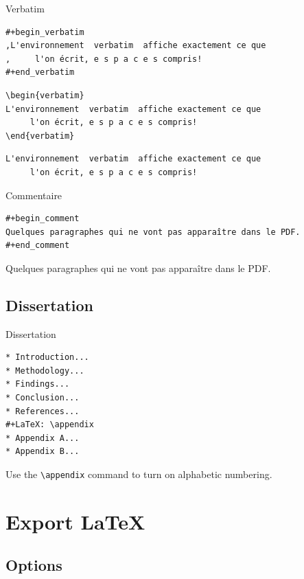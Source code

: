 \documentclass[presentation,t,hideothersubsections]{beamer}
\begin{document}
\begin{frame}[fragile,label=sec-3-8-3]{Verbatim}
 \lstset{language=org,numbers=none}
\begin{lstlisting}
#+begin_verbatim
,L'environnement  verbatim  affiche exactement ce que
,     l'on écrit, e s p a c e s compris!
#+end_verbatim
\end{lstlisting}

\lstset{language=TeX,numbers=none}
\begin{lstlisting}
\begin{verbatim}
L'environnement  verbatim  affiche exactement ce que
     l'on écrit, e s p a c e s compris!
\end{verbatim}
\end{lstlisting}

\begin{verbatim}
L'environnement  verbatim  affiche exactement ce que
     l'on écrit, e s p a c e s compris!
\end{verbatim}
\end{frame}
\begin{frame}[fragile,label=sec-3-8-4]{Commentaire}
 \lstset{language=org,numbers=none}
\begin{lstlisting}
#+begin_comment
Quelques paragraphes qui ne vont pas apparaître dans le PDF.
#+end_comment
\end{lstlisting}

Quelques paragraphes qui ne vont pas apparaître dans le PDF.
\end{frame}
\subsection{Dissertation}
\label{sec-3-9}

\begin{frame}[fragile,label=sec-3-9-1]{Dissertation}
 \lstset{language=org,numbers=none}
\begin{lstlisting}
* Introduction...
* Methodology...
* Findings...
* Conclusion...
* References...
#+LaTeX: \appendix
* Appendix A...
* Appendix B...
\end{lstlisting}

Use the \texttt{\textbackslash{}appendix} command to turn on alphabetic numbering.
\end{frame}
\section{Export \LaTeX{}}
\label{sec-4}

\subsection{Options}
\label{sec-4-1}
\end{document}
